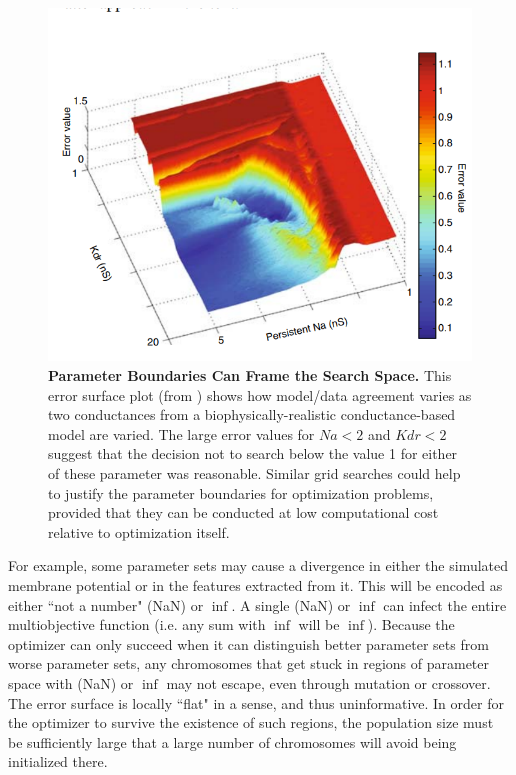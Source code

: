 \begin{figure}
    \centering
    \includegraphics[scale=0.65]{figures/cliff.png}
    \caption[A Plot of a Cliff Ledge Framing a 2D Error Surface]{\textbf{Parameter Boundaries Can Frame the Search Space.}
This error surface plot (from \cite{van2007neurofitter,van2008automated})
shows how model/data agreement varies as two conductances from a biophysically-realistic conductance-based model are varied.
The large error values for $Na<2$ and $Kdr<2$ suggest that the decision not to search below the value 1 for either of these parameter was reasonable.
Similar grid searches could help to justify the parameter boundaries for optimization problems, provided that they can be conducted at low computational cost relative to optimization itself.}
    \label{fig:best_at_edge}
\end{figure}

For example, some parameter sets may cause a divergence in either the simulated membrane potential or in the features extracted from it.
This will be encoded as either ``not a number" (NaN) or $\inf$.
A single (NaN) or $\inf$ can infect the entire multiobjective function (i.e. any sum with $\inf$ will be $\inf$).
Because the optimizer can only succeed when it can distinguish better parameter sets from worse parameter sets, any chromosomes that get stuck in regions of parameter space with (NaN) or $\inf$ may not escape, even through mutation or crossover.
The error surface is locally ``flat" in a sense, and thus uninformative.
In order for the optimizer to survive the existence of such regions, the population size must be sufficiently large that a large number of chromosomes will avoid being initialized there.

